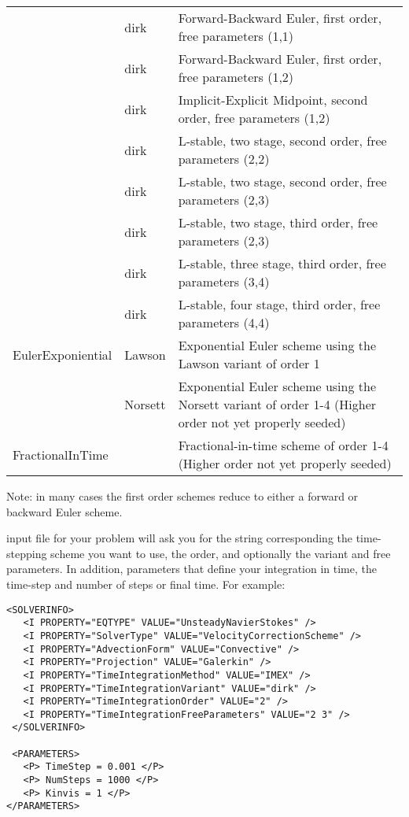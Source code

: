\begin{center}
\begin{tabular}{p{2.5cm}p{1cm}p{10cm}}
               & dirk & Forward-Backward Euler, first order, free parameters (1,1)\\
               & dirk & Forward-Backward Euler, first order, free parameters (1,2)\\
               & dirk & Implicit-Explicit Midpoint, second order, free parameters (1,2)\\
               & dirk & L-stable, two stage, second order, free parameters (2,2)\\
               & dirk & L-stable, two stage, second order, free parameters (2,3)\\
               & dirk & L-stable, two stage, third order, free parameters (2,3)\\
               & dirk & L-stable, three stage, third order, free parameters (3,4)\\
               & dirk & L-stable, four stage, third order, free parameters (4,4)\\

EulerExponiential & Lawson  & Exponential Euler scheme using the
                              Lawson variant of order 1 \\

                  & Norsett & Exponential Euler scheme using the
                              Norsett variant of order 1-4
                              (Higher order not yet properly seeded) \\

FractionalInTime  &         & Fractional-in-time scheme of order 1-4
                              (Higher order not yet properly seeded) \\
                    
\bottomrule
\end{tabular}
\end{center}

Note: in many cases the first order schemes reduce to either a forward
or backward Euler scheme.

{\nek} input file for your problem will ask you for the string
corresponding the time-stepping scheme you want to use, the order, and
optionally the variant and free parameters. In addition, parameters
that define your integration in time, the time-step and number of
steps or final time. For example:\\
\begin{lstlisting}[style=XMLStyle]
<SOLVERINFO>
   <I PROPERTY="EQTYPE" VALUE="UnsteadyNavierStokes" />
   <I PROPERTY="SolverType" VALUE="VelocityCorrectionScheme" />
   <I PROPERTY="AdvectionForm" VALUE="Convective" /> 
   <I PROPERTY="Projection" VALUE="Galerkin" /> 
   <I PROPERTY="TimeIntegrationMethod" VALUE="IMEX" />
   <I PROPERTY="TimeIntegrationVariant" VALUE="dirk" />
   <I PROPERTY="TimeIntegrationOrder" VALUE="2" />
   <I PROPERTY="TimeIntegrationFreeParameters" VALUE="2 3" />
 </SOLVERINFO>
 
 <PARAMETERS>
   <P> TimeStep = 0.001 </P> 
   <P> NumSteps = 1000 </P> 
   <P> Kinvis = 1 </P>
</PARAMETERS>
\end{lstlisting}

